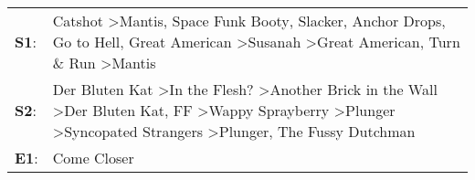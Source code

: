 \begin{supertabular}{p{0.03\textwidth}p{0.92\textwidth}}
 \textbf{S1}:  &                                   Catshot\textsuperscript{} \textgreater \enspace Mantis\textsuperscript{}, \enspace Space Funk Booty\textsuperscript{}, \enspace Slacker\textsuperscript{}, \enspace Anchor Drops\textsuperscript{}, \enspace Go to Hell\textsuperscript{}, \enspace Great American\textsuperscript{} \textgreater \enspace Susanah\textsuperscript{} \textgreater \enspace Great American\textsuperscript{}, \enspace Turn \& Run\textsuperscript{} \textgreater \enspace Mantis\textsuperscript{}  \enspace  \\
 \textbf{S2}:  &  Der Bluten Kat\textsuperscript{} \textgreater \enspace In the Flesh?\textsuperscript{} \textgreater \enspace Another Brick in the Wall\textsuperscript{} \textgreater \enspace Der Bluten Kat\textsuperscript{}, \enspace FF\textsuperscript{} \textgreater \enspace Wappy Sprayberry\textsuperscript{} \textgreater \enspace Plunger\textsuperscript{} \textgreater \enspace Syncopated Strangers\textsuperscript{} \textgreater \enspace Plunger\textsuperscript{}, \enspace The Fussy Dutchman\textsuperscript{}  \enspace  \\
 \textbf{E1}:  &                                                                                                                                                                                                                                                                                                                                                                                                                                                                                        Come Closer\textsuperscript{}  \enspace  \\
\end{supertabular}
